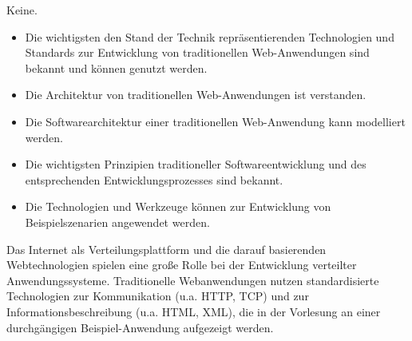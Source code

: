 \begin{module}
\begin{styleenv}
\begin{conditions}Keine.\end{conditions}


\end{styleenv}

\begin{learningoutcomes}
\begin{itemize}\item Die wichtigsten den Stand der Technik repräsentierenden Technologien und Standards zur Entwicklung von traditionellen Web-Anwendungen sind bekannt und können genutzt werden.  \item Die Architektur von traditionellen Web-Anwendungen ist verstanden.  \item Die Softwarearchitektur einer traditionellen Web-Anwendung kann modelliert werden.  \item Die wichtigsten Prinzipien traditioneller Softwareentwicklung und des entsprechenden Entwicklungsprozesses sind bekannt.  \item Die Technologien und Werkzeuge können zur Entwicklung von Beispielszenarien angewendet werden.  \end{itemize}
\end{learningoutcomes}

\begin{content}
Das Internet als Verteilungsplattform und die darauf basierenden Webtechnologien spielen eine große Rolle bei der Entwicklung verteilter Anwendungssysteme. Traditionelle Webanwendungen nutzen standardisierte Technologien zur Kommunikation (u.a. HTTP, TCP) und zur Informationsbeschreibung (u.a. HTML, XML), die in der Vorlesung an einer durchgängigen Beispiel-Anwendung aufgezeigt werden.


\end{content}



\end{module}

